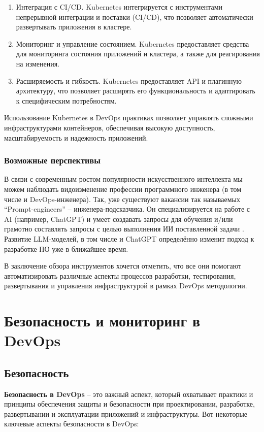 \documentclass[referat]{SCWorks}
\begin{document}
\begin{enumerate}
\item Интеграция с CI/CD. Kubernetes интегрируется с инструментами непрерывной интеграции и поставки (CI/CD), что позволяет автоматически развертывать приложения в кластере.

\item Мониторинг и управление состоянием. Kubernetes предоставляет средства для мониторинга состояния приложений и кластера, а также для реагирования на изменения.

\item Расширяемость и гибкость. Kubernetes предоставляет API и плагинную архитектуру, что позволяет расширять его функциональность и адаптировать к специфическим потребностям.
\end{enumerate}

Использование Kubernetes в DevOps практиках позволяет управлять сложными инфраструктурами контейнеров, обеспечивая высокую доступность, масштабируемость и надежность приложений.

\subsubsection{Возможные перспективы}

В связи с современным ростом популярности искусственного интеллекта мы можем наблюдать видоизменение профессии программного инженера (в том числе и DevOps-инженера). Так, уже существуют вакансии так называемых ``Prompt-engineers'' -- инженера-подсказчика. Он специализируется на работе с AI (например, ChatGPT) и умеет создавать запросы для обучения и/или грамотно составлять запросы с целью выполнения ИИ поставленной задачи \cite{PromptEngineer}. Развитие LLM-моделей, в том числе и ChatGPT определённо изменит подход к разработке ПО уже в ближайшее время.

В заключение обзора инструментов хочется отметить, что все они помогают автоматизировать различные аспекты процессов разработки, тестирования, развертывания и управления инфраструктурой в рамках DevOps методологии.

\section{Безопасность и мониторинг в DevOps}
\subsection{Безопасность}

\textbf{Безопасность в DevOps} – это важный аспект, который охватывает практики и принципы обеспечения защиты и безопасности при проектировании, разработке, развертывании и эксплуатации приложений и инфраструктуры. Вот некоторые ключевые аспекты безопасности в DevOps:
\end{document}
